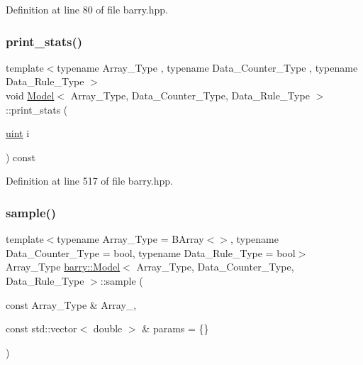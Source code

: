Definition at line 80 of file barry.\+hpp.

\mbox{\label{classbarry_1_1_model_ac00b5c6a1446ad00fdf1d92c9cb1df3c}} 
\subsubsection{\texorpdfstring{print\+\_\+stats()}{print\_stats()}}
{\footnotesize\ttfamily template$<$typename Array\+\_\+\+Type , typename Data\+\_\+\+Counter\+\_\+\+Type , typename Data\+\_\+\+Rule\+\_\+\+Type $>$ \\
void \hyperlink{classbarry_1_1_model}{Model}$<$ Array\+\_\+\+Type, Data\+\_\+\+Counter\+\_\+\+Type, Data\+\_\+\+Rule\+\_\+\+Type $>$\+::print\+\_\+stats (\begin{DoxyParamCaption}\item[{\hyperlink{namespacebarry_a11dfc53ddb4672278319aa04f1e09a6c}{uint}}]{i }\end{DoxyParamCaption}) const\hspace{0.3cm}{\ttfamily [inline]}}



Definition at line 517 of file barry.\+hpp.

\mbox{\label{classbarry_1_1_model_a1b7b9ad1362b8de49c00e7e8d5d3675e}} 
\subsubsection{\texorpdfstring{sample()}{sample()}\hspace{0.1cm}{\footnotesize\ttfamily [1/2]}}
{\footnotesize\ttfamily template$<$typename Array\+\_\+\+Type  = B\+Array$<$$>$, typename Data\+\_\+\+Counter\+\_\+\+Type  = bool, typename Data\+\_\+\+Rule\+\_\+\+Type  = bool$>$ \\
Array\+\_\+\+Type \hyperlink{classbarry_1_1_model}{barry\+::\+Model}$<$ Array\+\_\+\+Type, Data\+\_\+\+Counter\+\_\+\+Type, Data\+\_\+\+Rule\+\_\+\+Type $>$\+::sample (\begin{DoxyParamCaption}\item[{const Array\+\_\+\+Type \&}]{Array\+\_\+,  }\item[{const std\+::vector$<$ double $>$ \&}]{params = {\ttfamily \{\}} }\end{DoxyParamCaption})}

